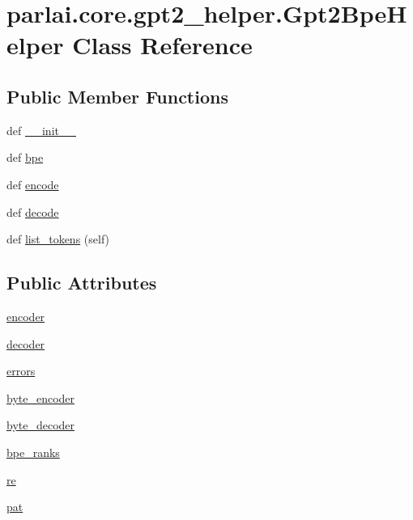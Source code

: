 \hypertarget{classparlai_1_1core_1_1gpt2__helper_1_1Gpt2BpeHelper}{}\section{parlai.\+core.\+gpt2\+\_\+helper.\+Gpt2\+Bpe\+Helper Class Reference}
\label{classparlai_1_1core_1_1gpt2__helper_1_1Gpt2BpeHelper}
\subsection*{Public Member Functions}
\begin{DoxyCompactItemize}
\item 
def \hyperlink{classparlai_1_1core_1_1gpt2__helper_1_1Gpt2BpeHelper_a840a966672e91e86b92e94818655d283}{\+\_\+\+\_\+init\+\_\+\+\_\+}
\item 
def \hyperlink{classparlai_1_1core_1_1gpt2__helper_1_1Gpt2BpeHelper_a4cbde811e48261fb369a87e68cd138cc}{bpe}
\item 
def \hyperlink{classparlai_1_1core_1_1gpt2__helper_1_1Gpt2BpeHelper_a1957224e1cefc6c5a0ec1c4e992ffe37}{encode}
\item 
def \hyperlink{classparlai_1_1core_1_1gpt2__helper_1_1Gpt2BpeHelper_aa14f66814fe7f0030582684666a74b0d}{decode}
\item 
def \hyperlink{classparlai_1_1core_1_1gpt2__helper_1_1Gpt2BpeHelper_a36f3a5cb4264010b4891605508147442}{list\+\_\+tokens} (self)
\end{DoxyCompactItemize}
\subsection*{Public Attributes}
\begin{DoxyCompactItemize}
\item 
\hyperlink{classparlai_1_1core_1_1gpt2__helper_1_1Gpt2BpeHelper_a794ff2b9372acac9ab7c80b5c07ab60b}{encoder}
\item 
\hyperlink{classparlai_1_1core_1_1gpt2__helper_1_1Gpt2BpeHelper_a26ab20eb1b181e46035f2164513d8fce}{decoder}
\item 
\hyperlink{classparlai_1_1core_1_1gpt2__helper_1_1Gpt2BpeHelper_a0ea9f7588f25a62eb6021a54ea8ca095}{errors}
\item 
\hyperlink{classparlai_1_1core_1_1gpt2__helper_1_1Gpt2BpeHelper_aa05888129c3d12eec57bc03e92390e4c}{byte\+\_\+encoder}
\item 
\hyperlink{classparlai_1_1core_1_1gpt2__helper_1_1Gpt2BpeHelper_aaa6f9b57563422f3651ee240013ae9f4}{byte\+\_\+decoder}
\item 
\hyperlink{classparlai_1_1core_1_1gpt2__helper_1_1Gpt2BpeHelper_a3138a0a7614de78ee773642fbe6ddaae}{bpe\+\_\+ranks}
\item 
\hyperlink{classparlai_1_1core_1_1gpt2__helper_1_1Gpt2BpeHelper_ac1ad446c51c26831655244d83350589a}{re}
\item 
\hyperlink{classparlai_1_1core_1_1gpt2__helper_1_1Gpt2BpeHelper_afbdbf5259b69f21f389eecaaada838d8}{pat}
\end{DoxyCompactItemize}

